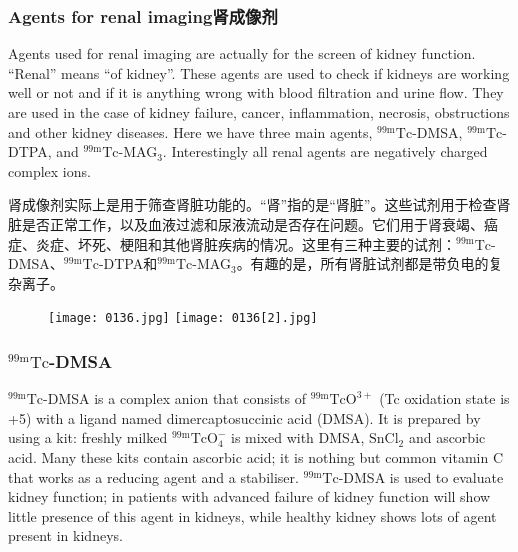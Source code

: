 \documentclass[dvipsnames, svgnames,a4paper,11pt]{article}
\begin{document}
\subsubsection{Agents for renal imaging肾成像剂}

Agents used for renal imaging are actually for the screen of kidney function. “Renal”
means “of kidney”. These agents are used to check if kidneys are working well or not
and if it is anything wrong with blood filtration and urine flow. They are used in the
case of kidney failure, cancer, inflammation, necrosis, obstructions and other kidney
diseases. Here we have three main agents, ${}^\mathrm{99m}\mathrm{Tc}$-DMSA, ${}^\mathrm{99m}\mathrm{Tc}$-DTPA, and ${}^\mathrm{99m}\mathrm{Tc}$-MAG${}_3$. Interestingly all renal agents are negatively charged complex ions.

肾成像剂实际上是用于筛查肾脏功能的。“肾”指的是“肾脏”。这些试剂用于检查肾脏是否正常工作，以及血液过滤和尿液流动是否存在问题。它们用于肾衰竭、癌症、炎症、坏死、梗阻和其他肾脏疾病的情况。这里有三种主要的试剂：${}^\mathrm{99m}\mathrm{Tc}$-DMSA、${}^\mathrm{99m}\mathrm{Tc}$-DTPA和${}^\mathrm{99m}\mathrm{Tc}$-MAG${}_3$。有趣的是，所有肾脏试剂都是带负电的复杂离子。

\begin{figure}[h]
	\centering
    \texttt{[image: 0136.jpg]}    
    \hspace{0.1in}
    \texttt{[image: 0136[2].jpg]} 
     \label{fig139}
\end{figure}

\subsubsection{${}^\mathrm{99m}\mathrm{Tc}$-DMSA}

${}^\mathrm{99m}\mathrm{Tc}$-DMSA is a complex anion that consists of ${}^\mathrm{99m}\mathrm{TcO^{3+}}$ (Tc oxidation state is +5)
with a ligand named dimercaptosuccinic acid (DMSA). It is prepared by using a kit:
freshly milked ${}^\mathrm{99m}\mathrm{TcO_4^-}$ is mixed with DMSA, $\mathrm{SnCl_2}$ and ascorbic acid. Many these
kits contain ascorbic acid; it is nothing but common vitamin C that works as a
reducing agent and a stabiliser. ${}^\mathrm{99m}\mathrm{Tc}$-DMSA is used to evaluate kidney function; in
patients with advanced failure of kidney function will show little presence of this
agent in kidneys, while healthy kidney shows lots of agent present in kidneys.
\end{document}
